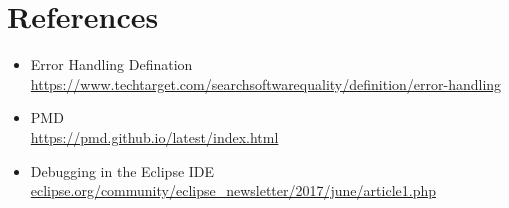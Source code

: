 \documentclass[a4paper, 12pt]{article}
\begin{document}
\section*{References}
\begin{itemize}
    \item Error Handling Defination \\ \href{https://www.techtarget.com/searchsoftwarequality/definition/error-handling}{https://www.techtarget.com/searchsoftwarequality/definition/error-handling}
    \item PMD \\
    \href{https://pmd.github.io/latest/index.html}{https://pmd.github.io/latest/index.html}
    \item Debugging in the Eclipse IDE \\
    \href{eclipse.org/community/eclipse\_newsletter/2017/june/article1.php}{eclipse.org/community/eclipse\_newsletter/2017/june/article1.php}
\end{itemize}
\end{document}
